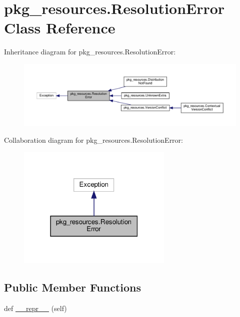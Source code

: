 \hypertarget{classpkg__resources_1_1ResolutionError}{}\section{pkg\+\_\+resources.\+Resolution\+Error Class Reference}
\label{classpkg__resources_1_1ResolutionError}


Inheritance diagram for pkg\+\_\+resources.\+Resolution\+Error\+:
\nopagebreak
\begin{figure}[H]
\begin{center}
\leavevmode
\includegraphics[width=350pt]{classpkg__resources_1_1ResolutionError__inherit__graph}
\end{center}
\end{figure}


Collaboration diagram for pkg\+\_\+resources.\+Resolution\+Error\+:
\nopagebreak
\begin{figure}[H]
\begin{center}
\leavevmode
\includegraphics[width=210pt]{classpkg__resources_1_1ResolutionError__coll__graph}
\end{center}
\end{figure}
\subsection*{Public Member Functions}
\begin{DoxyCompactItemize}
\item 
def \hyperlink{classpkg__resources_1_1ResolutionError_a6f7aee7ab8931a20c36cf96c564fcf55}{\+\_\+\+\_\+repr\+\_\+\+\_\+} (self)
\end{DoxyCompactItemize}


